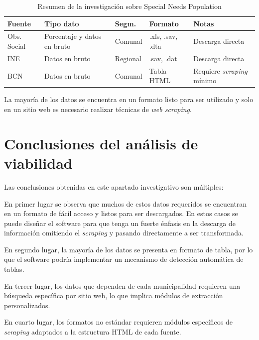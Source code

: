 \documentclass[12pt,letterpaper,oneside]{report}
\begin{document}
\begin{table}[H]
\centering
\caption{Resumen de la investigaci\'on sobre Special Needs Population}
\label{tab:snp}
\begin{tabular}{|p{3cm}|p{2.5cm}|p{2cm}|p{2cm}|p{3cm}|}
\hline
\textbf{Fuente} & \textbf{Tipo dato} & \textbf{Segm.} & \textbf{Formato} & \textbf{Notas} \\
\hline
Obs. Social \parencite{observatoriosocial} & Porcentaje y datos en bruto & Comunal & .xls, .sav, .dta & Descarga directa \\
\hline
INE \parencite{ine-b} & Datos en bruto & Regional & .sav, .dat & Descarga directa \\
\hline
BCN \parencite{bcn-c} & Datos en bruto & Comunal & Tabla HTML & Requiere \textit{scraping} m\'inimo \\
\hline
\end{tabular}
\end{table}

La mayor\'ia de los datos se encuentra en un formato listo para ser utilizado y solo en un sitio web es necesario realizar t\'ecnicas de \textit{web scraping}.

\section{Conclusiones del an\'alisis de viabilidad}
\label{sec:conclusiones-viabilidad}

Las conclusiones obtenidas en este apartado investigativo son m\'ultiples:

En primer lugar se observa que muchos de estos datos requeridos se encuentran en un formato de f\'acil acceso y listos para ser descargados. En estos casos se puede dise\~nar el software para que tenga un fuerte \'enfasis en la descarga de informaci\'on omitiendo el \textit{scraping} y pasando directamente a ser transformada.

En segundo lugar, la mayor\'ia de los datos se presenta en formato de tabla, por lo que el software podr\'ia implementar un mecanismo de detecci\'on autom\'atica de tablas.

En tercer lugar, los datos que dependen de cada municipalidad requieren una b\'usqueda espec\'ifica por sitio web, lo que implica m\'odulos de extracci\'on personalizados.

En cuarto lugar, los formatos no est\'andar requieren m\'odulos espec\'ificos de \textit{scraping} adaptados a la estructura HTML de cada fuente.


\end{document}
